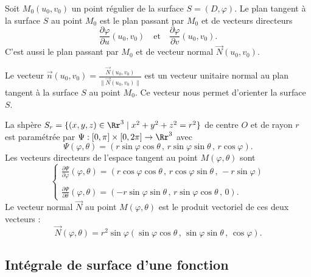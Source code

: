 \documentclass[class=report,crop=false]{standalone}
\begin{document}
\vskip6mm

\begin{proposition}[\bf Définition]Soit $M_0(u_0,v_0)$ un point régulier de la surface $S=(D,\varphi)$. Le plan tangent à la surface $S$ au point $M_0$ est le plan passant par $M_0$ et de vecteurs directeurs
$$\frac{\partial \varphi}{\partial u}(u_0,v_0)\quad \mbox{et}\quad \frac{\partial \varphi}{\partial v}(u_0,v_0).$$
C'est aussi le plan passant par $M_0$ et de vecteur normal $\overrightarrow{N}(u_0,v_0)$.
\end{proposition}

\vskip4mm

Le vecteur $\displaystyle \overrightarrow{n}(u_0,v_0)=\frac{\overrightarrow{N}(u_0,v_0)}{\|\overrightarrow{N}(u_0,v_0)\|}$ est un vecteur unitaire normal au plan tangent à la surface $S$ au point $M_0$. Ce vecteur nous permet d'orienter la surface $S$.

\vskip6mm

La shpère $S_r=\{(x,y,z)\in \Rr^3\mid x^2+y^2+z^2=r^2\}$ de centre $O$ et de rayon $r$ est paramétrée par $\displaystyle \Psi :[0,\pi ]\times [0,2\pi]\to \Rr^3$ avec
$$\Psi (\varphi ,\theta )=\left(r\sin \varphi \cos \theta \, ,\, r\sin \varphi \sin \theta  \, ,\, r\cos \varphi \right).$$
Les vecteurs directeurs de l'espace tangent au point $M(\varphi ,\theta )$ sont
$$\left\{\begin{array}{l}\displaystyle \frac{\partial \Psi}{\partial \varphi}(\varphi ,\theta )=\left(r\cos \varphi \cos \theta \, ,\, r\cos \varphi\sin \theta \, ,\, -r\sin \varphi\right)\\ \\ \displaystyle \frac{\partial \Psi}{\partial \theta}(\varphi ,\theta )=\left(-r\sin \varphi\sin \theta \, ,\, r\sin \varphi\cos \theta \, ,\, 0\right).\end{array}\right.$$
Le vecteur normal $\overrightarrow{N}$ au point $M(\varphi ,\theta )$ est le produit vectoriel de ces deux vecteurs :
$$\overrightarrow{N}(\varphi ,\theta )=r^2\sin \varphi \left(\sin \varphi \cos \theta \, ,\, \sin \varphi \sin \theta \, ,\, \cos \varphi \right).$$

\vskip8mm

\subsection{Intégrale de surface d'une fonction}

\vskip4mm
\end{document}
